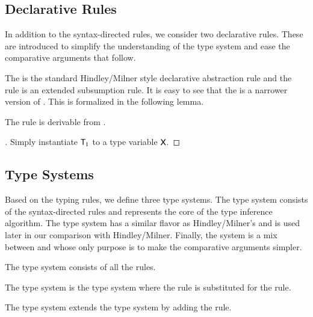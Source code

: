 \documentclass{report}
\begin{document}
  \subsection{Declarative Rules}
  In addition to the syntax-directed rules, we consider two declarative
  rules. These are introduced to simplify the understanding of the type system and ease
  the comparative arguments that follow.
  The \decabs is the standard Hindley/Milner style declarative abstraction rule and the \decsub rule
  is an extended subsumption rule. It is easy to see that the \sdabs is a narrower version
  of \decabs. This is formalized in the following lemma.
  \begin{lemma}
    The rule \sdabs is derivable from \decabs.
  \end{lemma}
  \begin{proof}[]
    Simply instantiate $\textsf{T}_1$ to a type variable $\textsf{X}$.
  \end{proof}
  
  \subsection{Type Systems}
  Based on the typing rules, we define three type systems. The \BQ
  type system consists of the syntax-directed rules and represents the core of the
  type inference algorithm.
  The type system \BQsa has a similar flavor as Hindley/Milner's and is used later in our comparison
  with Hindley/Milner. Finally, the \BQa system is a mix between \BQ and \BQsa whose only purpose
  is to make the comparative arguments simpler.
  
  \begin{dfn}
    The type system \BQ consists of all the \sdrules rules.
  \end{dfn}
  \begin{dfn}
    The type system \BQa is the \BQ type system where the \sdabs rule is substituted
    for the \decabs rule.
  \end{dfn}
  \begin{dfn}
    The type system \BQsa extends the \BQa type system by adding the \decsub rule.
  \end{dfn}
  
\end{document}

